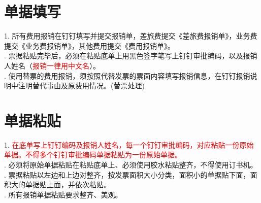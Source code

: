 \documentclass[scheme=plain,UTF8]{ctexart}
\begin{document}
\section{单据填写}                                                                                                                                                                                                                                                                                                                                         
1.	所有费用报销在钉钉填写并提交报销单，差旅费提交《差旅费报销单》，业务费提交《业务费报销单》，其他费用提交《费用报销单》。\\.	票据粘贴完毕后，必须在粘贴底单上用黑色签字笔写上钉钉审批编码，以及报销人姓名（\textcolor{red}{报销一律用中文名}）。\\.	使用替票的费用报销，须按照代替发票的票面内容填写报销信息，在钉钉报销说明中注明替代事由及原费用情况。(替票处理)

\section{单据粘贴}
1.	\textcolor{red}{在底单写上钉钉编码及报销人姓名，每一个钉钉审批编码，对应粘贴一份原始单据。不得多个钉钉审批编码单据粘贴为一份原始单据。}\\.	必须将原始单据粘贴在粘贴底单上、必须使用胶水粘贴整齐，不得使用订书机。 \\.	票据粘贴以左边和上边对整齐，按发票面积大小分类，面积小的单据贴下面，面积大的单据贴上面，并依次粘贴。\\.	所有报销单据粘贴要求整齐、美观。 
\end{document}
